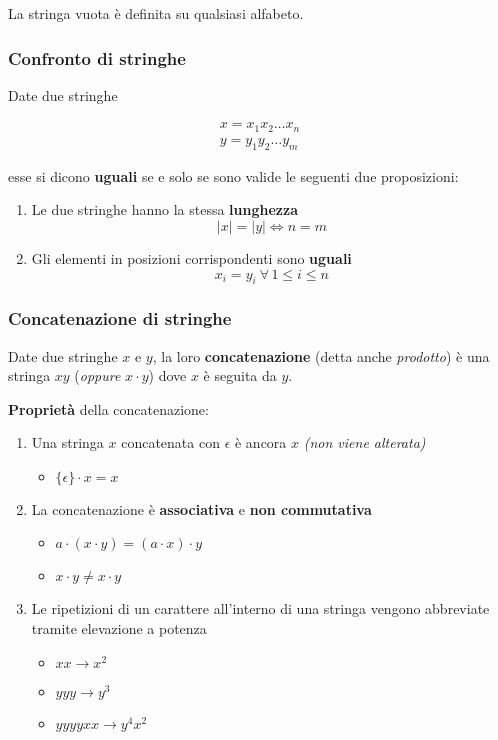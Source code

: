 \documentclass[italian, 10pt]{article}
\begin{document}
La stringa vuota è definita su qualsiasi alfabeto.

\subsubsection{Confronto di stringhe}

Date due stringhe

\begin{gather*}
  x = x_1 x_2 \ldots x_n \\
  y = y_1 y_2 \ldots y_m
\end{gather*}

esse si dicono \textbf{uguali} se e solo se sono valide le seguenti due proposizioni:

\begin{enumerate}
  \item Le due stringhe hanno la stessa \textbf{lunghezza} \[ |x| = |y| \Leftrightarrow n = m \]
  \item Gli elementi in posizioni corrispondenti sono \textbf{uguali} \[ x_i = y_i \ \forall \, 1 \leq i \leq n \]
\end{enumerate}

\subsubsection{Concatenazione di stringhe}

Date due stringhe \(x\) e \(y\), la loro \textbf{concatenazione} (detta anche \textit{prodotto}) è una stringa \(xy\) (\textit{oppure} \(x \cdot y \)) dove \(x\) è seguita da \(y\).

\bigskip
\textbf{Proprietà} della concatenazione:

\begin{enumerate}
  \item Una stringa \(x\) concatenata con \(\epsilon\) è ancora \(x\) \textit{(non viene alterata)}
        \begin{itemize}[label=\(\rightarrow\)]
          \item \(\{\epsilon\} \cdot x = x\)
        \end{itemize}
  \item La concatenazione è \textbf{associativa} e \textbf{non commutativa}
        \begin{itemize}[label=\(\rightarrow\)]
          \item \(a \cdot (x \cdot y) = (a \cdot x) \cdot y\)
          \item \(x \cdot y \neq x \cdot y\)
        \end{itemize}
  \item Le ripetizioni di un carattere all'interno di una stringa vengono abbreviate tramite elevazione a potenza
        \begin{itemize}[label=\(\rightarrow\)]
          \item \(xx \rightarrow x^2\)
          \item \(yyy \rightarrow y^3\)
          \item \(yyyyxx \rightarrow y^4 x^2\)
        \end{itemize}
\end{enumerate}
\end{document}
